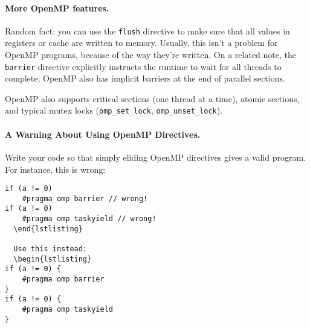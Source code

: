 \paragraph{More OpenMP features.} 
Random fact: you can use the {\tt flush} directive to make sure that
all values in registers or cache are written to memory. Usually, this
isn't a problem for OpenMP programs, because of the way they're
written. On a related note, the {\tt barrier} directive explicitly
instructs the runtime to wait for all threads to complete; OpenMP also
has implicit barriers at the end of parallel sections.  

OpenMP also supports critical sections (one thread at a time), atomic
sections, and typical mutex locks (\verb+omp_set_lock+,
\verb+omp_unset_lock+).

\paragraph{A Warning About Using OpenMP Directives.}
  Write your code so that simply eliding OpenMP directives gives a valid program. For instance, this is wrong:
  \begin{verbatim}
if (a != 0)
    #pragma omp barrier // wrong!
if (a != 0)
    #pragma omp taskyield // wrong!
  \end{lstlisting}

  Use this instead:
  \begin{lstlisting}
if (a != 0) {
    #pragma omp barrier
}
if (a != 0) {
    #pragma omp taskyield
}
  \end{verbatim}







